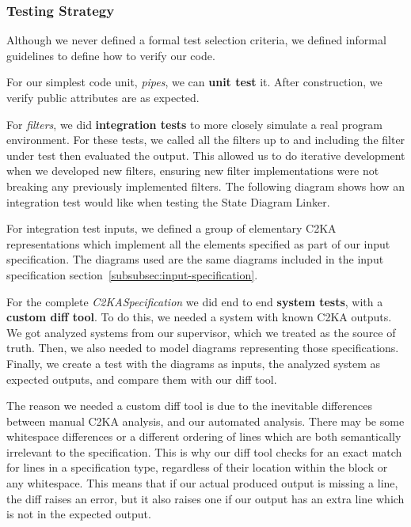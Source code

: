     \newpage
    \subsubsection{Testing Strategy}\label{subsubsec:tests-strat}
    Although we never defined a formal test selection criteria,
    we defined informal guidelines to define how to verify our code.

    For our simplest code unit, \textit{pipes}, we can \textbf{unit test} it.
    After construction, we verify public attributes are as expected.

    For \textit{filters}, we did \textbf{integration tests} to more closely simulate a real program environment.
    For these tests, we called all the filters up to and including the filter under test then evaluated the output.
    This allowed us to do iterative development when we developed new filters,
    ensuring new filter implementations were not breaking any previously implemented filters.
    The following diagram shows how an integration test would like when testing the State Diagram Linker.

    For integration test inputs, we defined a group of elementary C2KA representations which implement
    all the elements specified as part of our input specification.
    The diagrams used are the same diagrams included in the input specification section~\ref{subsubsec:input-specification}.

    For the complete \textit{C2KASpecification} we did end to end \textbf{system tests}, with a \textbf{custom diff tool}.
    To do this, we needed a system with known C2KA outputs.
    We got analyzed systems from our supervisor, which we treated as the source of truth.
    Then, we also needed to model diagrams representing those specifications.
    Finally, we create a test with the diagrams as inputs, the analyzed system as expected outputs,
    and compare them with our diff tool.

    The reason we needed a custom diff tool is due to the inevitable differences between manual C2KA analysis,
    and our automated analysis.
    There may be some whitespace differences or a different ordering of lines
    which are both semantically irrelevant to the specification.
    This is why our diff tool checks for an exact match for lines in a specification type,
    regardless of their location within the block or any whitespace.
    This means that if our actual produced output is missing a line, the diff raises an error,
    but it also raises one if our output has an extra line which is not in the expected output.

